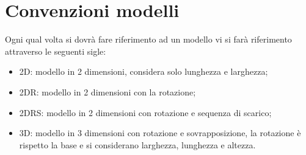 \section{Convenzioni modelli}
Ogni qual volta si dovrà fare riferimento ad un modello vi si farà riferimento attraverso le seguenti sigle:
\begin{itemize}
    \item 2D: modello in 2 dimensioni, considera solo lunghezza e larghezza;
    \item 2DR: modello in 2 dimensioni con la rotazione;
    \item 2DRS: modello in 2 dimensioni con rotazione e sequenza di scarico;
    \item 3D: modello in 3 dimensioni con rotazione e sovrapposizione, la rotazione è rispetto la base e si considerano larghezza, lunghezza e altezza.
\end{itemize}